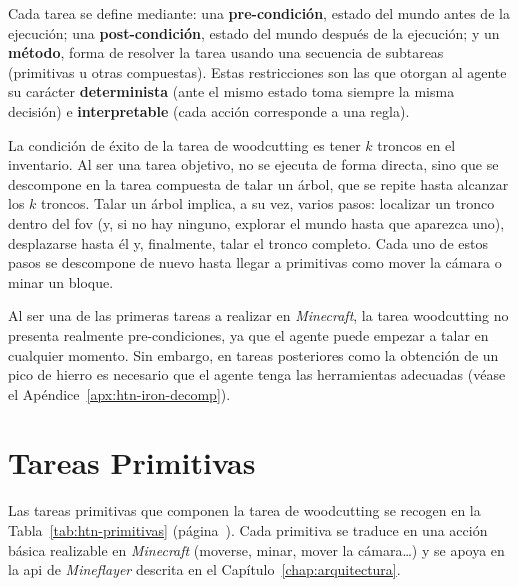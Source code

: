 Cada tarea se define mediante: una \textbf{pre-condición}, estado del mundo antes de la ejecución;
una \textbf{post-condición}, estado del mundo después de la ejecución; y un \textbf{método}, forma de resolver la tarea usando 
una secuencia de subtareas (primitivas u otras compuestas). 
Estas restricciones son las que otorgan al agente su carácter \textbf{determinista} (ante el
mismo estado toma siempre la misma decisión) e \textbf{interpretable} (cada acción
corresponde a una regla).

La condición de éxito de la tarea de \gls{woodcutting} es tener $k$ troncos en
el inventario. Al ser una tarea objetivo, no se ejecuta de forma directa, sino que se
descompone en la tarea compuesta de talar un árbol, que se repite hasta alcanzar
los $k$ troncos. Talar un árbol implica, a su vez, varios pasos: localizar un tronco
dentro del \gls{fov} (y, si no hay ninguno, explorar el mundo hasta que aparezca
uno), desplazarse hasta él y, finalmente, talar el tronco completo. Cada uno de estos
pasos se descompone de nuevo hasta llegar a primitivas como mover la cámara o minar un bloque.

Al ser una de las primeras tareas a realizar en \textit{Minecraft}, la tarea \gls{woodcutting} no presenta realmente pre-condiciones, ya que el agente puede empezar a talar en cualquier momento. Sin embargo, en tareas posteriores como la obtención de un pico de hierro es necesario que el agente tenga las herramientas adecuadas (véase el Apéndice~\ref{apx:htn-iron-decomp}).

\section{Tareas Primitivas}
Las tareas primitivas que componen la tarea de \gls{woodcutting} se recogen
en la Tabla~\ref{tab:htn-primitivas} (página~\pageref{tab:htn-primitivas}). Cada primitiva se traduce en una acción
básica realizable en \textit{Minecraft} (moverse, minar, mover la cámara\dots) y 
se apoya en la \acrshort{api} de \textit{Mineflayer} descrita en el Capítulo~\ref{chap:arquitectura}.

